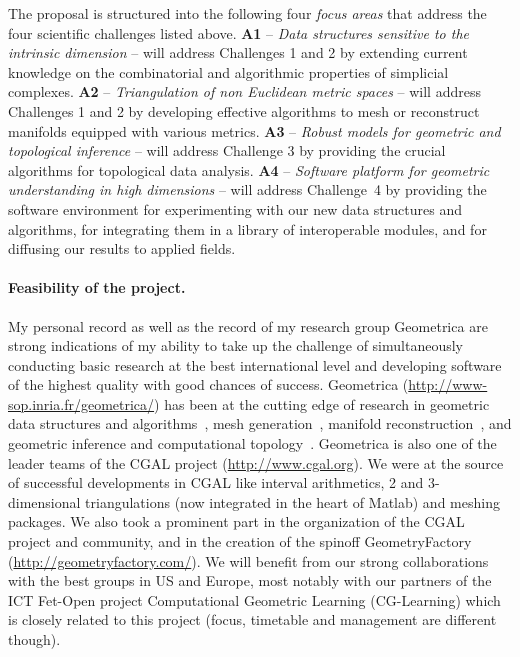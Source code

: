 The proposal is structured into the following four {\em focus areas}  that address the four scientific challenges listed above.
{\bf A1} -- {\em Data  structures sensitive to the intrinsic dimension} --  will address Challenges 1 and 2 by extending current knowledge on the combinatorial and algorithmic properties of simplicial complexes. 
  {\bf A2} --  {\em Triangulation of non Euclidean metric spaces} -- will address Challenges 1 and 2 by developing effective algorithms to mesh or reconstruct manifolds equipped with various metrics.   {\bf A3} -- {\em Robust models for geometric and topological inference} -- will address Challenge 3 by providing the crucial  algorithms for topological data analysis.
 {\bf A4} --  {\em  Software platform for geometric understanding in high dimensions} -- will address Challenge~4 by providing the software environment for experimenting with our new data structures and algorithms, for integrating them in a library of interoperable modules, and for diffusing our results to applied fields. 
\vspace{-3.1mm}

\paragraph{Feasibility of the project.} 


My personal record as well as the record of my research group Geometrica are strong indications of my ability to take up the challenge of simultaneously conducting basic research at the best international level and developing software of the highest quality with good chances of success.  
Geometrica (\url{http://www-sop.inria.fr/geometrica/}) has been at the cutting edge of research in geometric data
structures and algorithms~\cite{by-ag-98}, mesh
generation~\cite{geometrica-ecg-book}, manifold
reconstruction~\cite{geometrica-7142i,geometrica-bgo-09}, and geometric inference and computational topology~\cite{ccsm-gipm-2011,geometrica-cseh-07}. Geometrica is also one of the leader teams of the CGAL project (\url{http://www.cgal.org}{}).  We were at the source of successful developments in CGAL like interval arithmetics, 2 and 3-dimensional triangulations (now integrated in the heart of Matlab) and meshing packages. We also took a prominent part in the organization of the CGAL project and community, and in the creation of the spinoff GeometryFactory (\url{http://geometryfactory.com/}).
%
We will benefit from our strong collaborations with the best groups in US and  Europe,
most notably with our partners of the ICT Fet-Open project Computational Geometric Learning (CG-Learning) which is closely related to this project (focus, timetable and management are different though).

